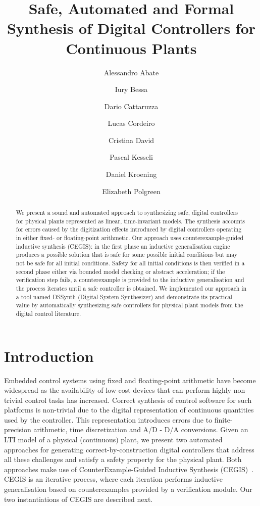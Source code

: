 \documentclass[submission]{eptcs}
\title{Safe, Automated and Formal Synthesis of Digital Controllers 
for Continuous Plants}
\author{Alessandro Abate
\institute{University of Oxford}
\and
Iury Bessa
\institute{Federal University of \\Amazonas, Brazil}
\and
Dario Cattaruzza
\institute{University of Oxford}
\and
Lucas Cordeiro
\institute{University of Oxford}
\and
Cristina David
\institute{University of Cambridge}
\and
Pascal Kesseli
\institute{University of Oxford}
\and
Daniel Kroening
\institute{University of Oxford}
\and
Elizabeth Polgreen
\institute{University of Oxford}
}
\begin{document}
\maketitle

\begin{abstract}
We present a sound and automated approach to synthesizing safe,
digital controllers for physical plants represented as linear,
time-invariant models. The synthesis
accounts for errors caused by the digitization effects introduced by
digital controllers operating in either fixed- or floating-point arithmetic. 
Our approach uses counterexample-guided inductive
synthesis (CEGIS): in the first phase an inductive generalisation engine produces a
possible solution that is safe for some possible initial conditions but may
not be safe for all initial conditions. Safety for all initial conditions
is then verified in a second phase either
via bounded model checking or abstract acceleration; if the verification step fails, a
counterexample is provided to the inductive generalisation and the
process iterates until a safe controller is obtained.  We implemented our approach
in a tool named DSSynth (Digital-System Synthesizer) and demonstrate
its practical value by automatically synthesizing safe controllers for physical 
plant models from the digital control literature.
\end{abstract}

\section{Introduction}

Embedded control systems using fixed and floating-point arithmetic 
have become widespread
as the availability of low-cost devices that can perform highly
non-trivial control tasks has increased. Correct synthesis of
control software for such platforms is non-trivial due to the digital representation of continuous quantities 
used by the controller. This representation introduces 
errors due to finite-precision arithmetic, time discretization and 
A/D - D/A conversions. Given an LTI model of a physical (continuous) plant, we present two automated approaches for generating
correct-by-construction digital controllers that address all these
challenges and satisfy a safety property for the physical plant. 
Both approaches make use of CounterExample-Guided
Inductive Synthesis (CEGIS)~\cite{jha-icse10,
  DBLP:conf/asplos/Solar-LezamaTBSS06}.  CEGIS is an
iterative process, where each iteration performs inductive
generalisation based on counterexamples provided by a verification module. 
Our two instantiations of CEGIS are
described next. 
\end{document}
